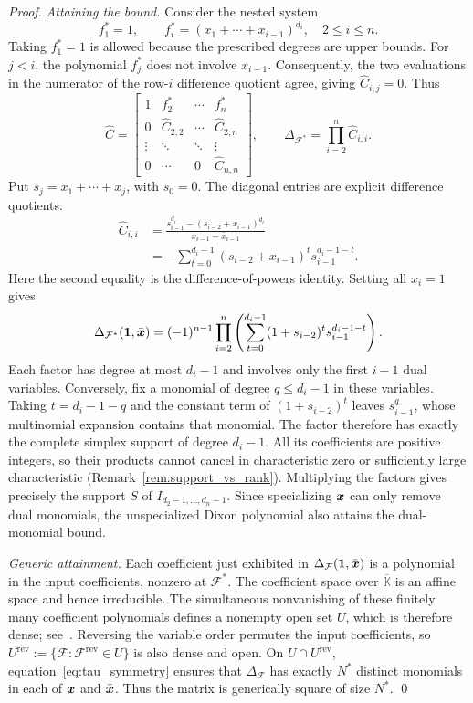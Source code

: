 \begin{proof}
\emph{Attaining the bound.}
Consider the nested system
\[
f_1^*=1,\qquad f_i^*=(x_1+\cdots+x_{i-1})^{d_i},\quad 2\le i\le n.
\]
Taking $f_1^*=1$ is allowed because the prescribed degrees are upper bounds. For $j<i$, the polynomial $f_j^*$ does not involve $x_{i-1}$. Consequently, the two evaluations in the numerator of the row-$i$ difference quotient agree, giving $\widehat C_{i,j}=0$. Thus
\[
\widehat C=
\begin{bmatrix}
1 & f_2^* & \cdots & f_n^*\\
0 & \widehat C_{2,2} & \cdots & \widehat C_{2,n}\\
\vdots & \ddots & \ddots & \vdots\\
0 & \cdots & 0 & \widehat C_{n,n}
\end{bmatrix},
\qquad
\Delta_{\mathcal F^*}=\prod_{i=2}^n\widehat C_{i,i}.
\]
Put $s_j=\bar x_1+\cdots+\bar x_j$, with $s_0=0$. The diagonal entries are explicit difference quotients:
\begin{align*}
\widehat C_{i,i}
&=\frac{s_{i-1}^{d_i}-(s_{i-2}+x_{i-1})^{d_i}}{x_{i-1}-\bar x_{i-1}}\\
&=-\sum_{t=0}^{d_i-1}(s_{i-2}+x_{i-1})^t s_{i-1}^{d_i-1-t}.
\end{align*}
Here the second equality is the difference-of-powers identity. Setting all $x_i=1$ gives
\[
\Delta_{\mathcal F^*}(\mathbf1,\bar{{\boldsymbol{x}}})
=(-1)^{n-1}\prod_{i=2}^n
\left(\sum_{t=0}^{d_i-1}(1+s_{i-2})^t s_{i-1}^{d_i-1-t}\right).
\]
Each factor has degree at most $d_i-1$ and involves only the first $i-1$ dual variables. Conversely, fix a monomial of degree $q\le d_i-1$ in these variables. Taking $t=d_i-1-q$ and the constant term of $(1+s_{i-2})^t$ leaves $s_{i-1}^{q}$, whose multinomial expansion contains that monomial. The factor therefore has exactly the complete simplex support of degree $d_i-1$. All its coefficients are positive integers, so their products cannot cancel in characteristic zero or sufficiently large characteristic (Remark~\ref{rem:support_vs_rank}). Multiplying the factors gives precisely the support $S$ of $I_{d_2-1,\ldots,d_n-1}$. Since specializing ${\boldsymbol{x}}$ can only remove dual monomials, the unspecialized Dixon polynomial also attains the dual-monomial bound.

\emph{Generic attainment.}
Each coefficient just exhibited in $\Delta_{\mathcal F}(\mathbf1,\bar{{\boldsymbol{x}}})$ is a polynomial in the input coefficients, nonzero at $\mathcal F^*$. The coefficient space over $\overline{\mathbb K}$ is an affine space and hence irreducible. The simultaneous nonvanishing of these finitely many coefficient polynomials defines a nonempty open set $U$, which is therefore dense; see~\cite[Chapter~3, \S5, Definition~(5.6), p.~115]{cox2005using}. Reversing the variable order permutes the input coefficients, so $U^{\mathrm{rev}}:=\{\mathcal F:\mathcal F^{\mathrm{rev}}\in U\}$ is also dense and open. On $U\cap U^{\mathrm{rev}}$, equation~\eqref{eq:tau_symmetry} ensures that $\Delta_{\mathcal F}$ has exactly $N^*$ distinct monomials in each of ${\boldsymbol{x}}$ and $\bar{{\boldsymbol{x}}}$. Thus the matrix is generically square of size $N^*$.
\qed
\end{proof}

